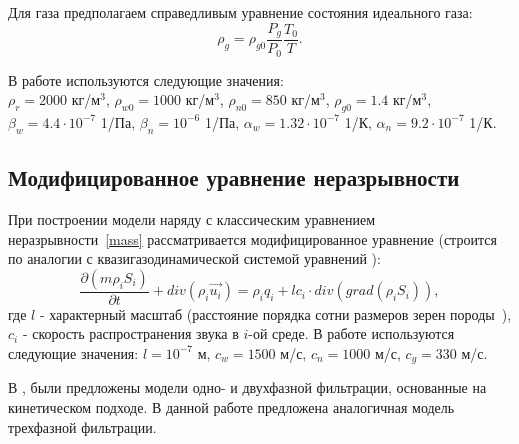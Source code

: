 Для газа предполагаем справедливым уравнение состояния идеального
газа:
$${\rho}_g = {\rho}_{g0}{\frac{P_g}{P_0}}{\frac{T_0}{T}}.$$

В работе используются следующие значения:\\
$\rho_r=2000$ кг/м$^3$, $\rho_{w0}=1000$ кг/м$^3$,
$\rho_{n0}=850$ кг/м$^3$, $\rho_{g0}=1.4$ кг/м$^3$,\\
$\beta_w=4.4\cdot10^{-7}$ 1/Па, $\beta_n=10^{-6}$ 1/Па,
$\alpha_w=1.32\cdot10^{-7}$ 1/К, $\alpha_n=9.2\cdot10^{-7}$ 1/К.

\subsection{Модифицированное уравнение неразрывности}
При построении модели наряду с классическим уравнением неразрывности~\ref{mass}
рассматривается модифицированное уравнение (строится по аналогии с квазигазодинамической системой
уравнений \cite{Chetverushkin-Mathmod}):
\begin{equation}
 \label{mass_mod}
  \frac{\partial (m \rho_i S_i)}{\partial t}+ div(\rho_i \overrightarrow{u_i}) = \rho_i q_i + l c_i \cdot div(grad(\rho_i S_i)),
\end{equation}
где $l$ - характерный масштаб (расстояние порядка сотни размеров зерен породы~\cite{Chetverushkin}),
$c_i$ - скорость распространения звука в $i$-ой среде.
В работе используются следующие значения: $l=10^{-7}$ м, $c_w=1500$ м/с, $c_n=1000$ м/с, $c_g=330$ м/с.

В \cite{Mathmod-2010},\cite{Mathmod-2011} были предложены модели одно- и двухфазной фильтрации, основанные на
кинетическом подходе. В данной работе предложена аналогичная модель трехфазной фильтрации.

